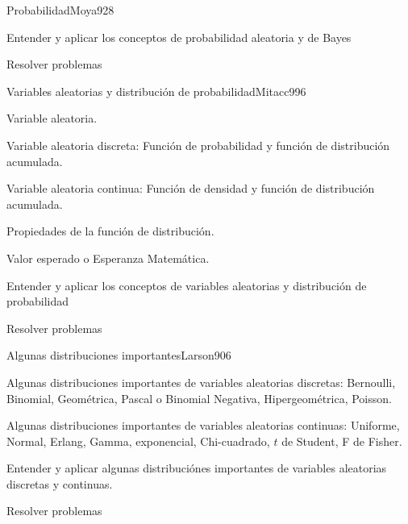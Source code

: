 \begin{syllabus}
\begin{unit}{Probabilidad}{Moya92}{8}
   \begin{learningoutcomes}
         \item  Entender y aplicar los conceptos de probabilidad aleatoria y de Bayes
         \item  Resolver problemas
   \end{learningoutcomes}
\end{unit}

\begin{unit}{Variables aleatorias y distribución de probabilidad}{Mitacc99}{6}
   \begin{topics}
         \item  Variable aleatoria.
	 \item  Variable aleatoria discreta: Función de probabilidad y función de distribución acumulada.
         \item  Variable aleatoria continua: Función de densidad y función de distribución acumulada.
	 \item  Propiedades de la función de distribución.
         \item  Valor esperado o Esperanza Matemática.
   \end{topics}

   \begin{learningoutcomes}
         \item  Entender y aplicar los conceptos de variables aleatorias y  distribución de probabilidad
         \item  Resolver problemas
   \end{learningoutcomes}
\end{unit}

\begin{unit}{Algunas distribuciones importantes}{Larson90}{6}
   \begin{topics}
         \item  Algunas distribuciones importantes de variables aleatorias discretas: Bernoulli, Binomial,  Geométrica, Pascal o Binomial Negativa, Hipergeométrica, Poisson.
	 \item  Algunas distribuciones importantes de variables aleatorias continuas: Uniforme, Normal, Erlang, Gamma, exponencial, Chi-cuadrado, $t$ de Student, F de Fisher.
   \end{topics}

   \begin{learningoutcomes}
         \item  Entender y aplicar algunas distribuciónes importantes de variables aleatorias discretas y continuas.
         \item  Resolver problemas
   \end{learningoutcomes}
\end{unit}


\end{syllabus}
